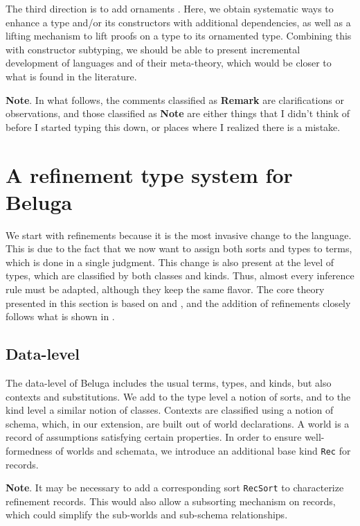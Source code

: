 \documentclass[letterpaper, 11pt]{article}
\begin{document}
    The third direction is to add ornaments \cite{McBride2011}.  Here, we obtain systematic ways to enhance a type and/or its constructors with 
    additional dependencies, as well as a lifting mechanism to lift proofs on a type to its ornamented type.  Combining this with constructor subtyping,
    we should be able to present incremental development of languages and of their meta-theory, which would be closer to what is found in the literature.

    \textbf{Note}. In what follows, the comments classified as \textbf{Remark} are clarifications or observations, and those classified as \textbf{Note} 
    are either things that I didn't think of before I started typing this down, or places where I realized there is a mistake.


    \section{A refinement type system for Beluga}
    
    We start with refinements because it is the most invasive change to the language.  This is due to the fact that we now want to assign both sorts
    and types to terms, which is done in a single judgment.  This change is also present at the level of types, which are classified by both classes
    and kinds.  Thus, almost every inference rule must be adapted, although they keep the same flavor.  The core theory presented in this section is
    based on \cite{Pientka2008} and \cite{PientkaDunfield2008}, and the addition of refinements closely follows what is shown in \cite{LovasPfenning2010}.

    \subsection{Data-level}
    The data-level of Beluga includes the usual terms, types, and kinds, but also contexts and substitutions.  We add to the type level a notion of sorts,
    and to the kind level a similar notion of classes.  Contexts are classified using a notion of schema, which, in our extension, are built out of
    world declarations.  A world is a record of assumptions satisfying certain properties.  In order to ensure well-formedness 
    of worlds and schemata, we introduce an additional base kind \texttt{Rec} for records.  

    \textbf{Note}. It may be necessary to add a corresponding sort \texttt{RecSort} to characterize refinement records.  This would also allow a
    subsorting mechanism on records, which could simplify the sub-worlds and sub-schema relationships.  
\end{document}
